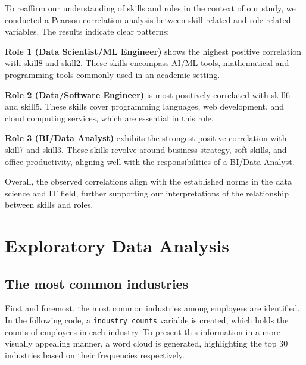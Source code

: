 \documentclass[11pt,]{article}
\begin{document}
To reaffirm our understanding of skills and roles in the context of our
study, we conducted a Pearson correlation analysis between skill-related
and role-related variables. The results indicate clear patterns:

\textbf{Role 1 (Data Scientist/ML Engineer)} shows the highest positive
correlation with skill8 and skill2. These skills encompass AI/ML tools,
mathematical and programming tools commonly used in an academic setting.

\textbf{Role 2 (Data/Software Engineer)} is most positively correlated
with skill6 and skill5. These skills cover programming languages, web
development, and cloud computing services, which are essential in this
role.

\textbf{Role 3 (BI/Data Analyst)} exhibits the strongest positive
correlation with skill7 and skill3. These skills revolve around business
strategy, soft skills, and office productivity, aligning well with the
responsibilities of a BI/Data Analyst.

Overall, the observed correlations align with the established norms in
the data science and IT field, further supporting our interpretations of
the relationship between skills and roles.

\hypertarget{exploratory-data-analysis}{%
\section{Exploratory Data Analysis}\label{exploratory-data-analysis}}

\hypertarget{the-most-common-industries}{%
\subsection{The most common
industries}\label{the-most-common-industries}}

First and foremost, the most common industries among employees are
identified. In the following code, a \texttt{industry\_counts} variable
is created, which holds the counts of employees in each industry. To
present this information in a more visually appealing manner, a word
cloud is generated, highlighting the top 30 industries based on their
frequencies respectively.
\end{document}
